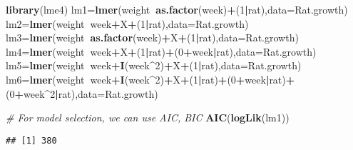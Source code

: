 \documentclass[12pt,]{book}
\newenvironment{Shaded}{\begin{snugshade}}{\end{snugshade}}
\newcommand{\KeywordTok}[1]{\textcolor[rgb]{0.13,0.29,0.53}{\textbf{#1}}}
\newcommand{\DataTypeTok}[1]{\textcolor[rgb]{0.13,0.29,0.53}{#1}}
\newcommand{\DecValTok}[1]{\textcolor[rgb]{0.00,0.00,0.81}{#1}}
\newcommand{\CommentTok}[1]{\textcolor[rgb]{0.56,0.35,0.01}{\textit{#1}}}
\newcommand{\OperatorTok}[1]{\textcolor[rgb]{0.81,0.36,0.00}{\textbf{#1}}}
\newcommand{\NormalTok}[1]{#1}
\begin{document}
\begin{Shaded}
\begin{Highlighting}[]
\KeywordTok{library}\NormalTok{(lme4)}
\NormalTok{lm1=}\KeywordTok{lmer}\NormalTok{(weight}\OperatorTok{~}\KeywordTok{as.factor}\NormalTok{(week)}\OperatorTok{+}\NormalTok{(}\DecValTok{1}\OperatorTok{|}\NormalTok{rat),}\DataTypeTok{data=}\NormalTok{Rat.growth)}
\NormalTok{lm2=}\KeywordTok{lmer}\NormalTok{(weight}\OperatorTok{~}\NormalTok{week}\OperatorTok{+}\NormalTok{X}\OperatorTok{+}\NormalTok{(}\DecValTok{1}\OperatorTok{|}\NormalTok{rat),}\DataTypeTok{data=}\NormalTok{Rat.growth)}
\NormalTok{lm3=}\KeywordTok{lmer}\NormalTok{(weight}\OperatorTok{~}\KeywordTok{as.factor}\NormalTok{(week)}\OperatorTok{+}\NormalTok{X}\OperatorTok{+}\NormalTok{(}\DecValTok{1}\OperatorTok{|}\NormalTok{rat),}\DataTypeTok{data=}\NormalTok{Rat.growth)}
\NormalTok{lm4=}\KeywordTok{lmer}\NormalTok{(weight}\OperatorTok{~}\NormalTok{week}\OperatorTok{+}\NormalTok{X}\OperatorTok{+}\NormalTok{(}\DecValTok{1}\OperatorTok{|}\NormalTok{rat)}\OperatorTok{+}\NormalTok{(}\DecValTok{0}\OperatorTok{+}\NormalTok{week}\OperatorTok{|}\NormalTok{rat),}\DataTypeTok{data=}\NormalTok{Rat.growth)}
\NormalTok{lm5=}\KeywordTok{lmer}\NormalTok{(weight}\OperatorTok{~}\NormalTok{week}\OperatorTok{+}\KeywordTok{I}\NormalTok{(week}\OperatorTok{^}\DecValTok{2}\NormalTok{)}\OperatorTok{+}\NormalTok{X}\OperatorTok{+}\NormalTok{(}\DecValTok{1}\OperatorTok{|}\NormalTok{rat),}\DataTypeTok{data=}\NormalTok{Rat.growth)}
\NormalTok{lm6=}\KeywordTok{lmer}\NormalTok{(weight}\OperatorTok{~}\NormalTok{week}\OperatorTok{+}\KeywordTok{I}\NormalTok{(week}\OperatorTok{^}\DecValTok{2}\NormalTok{)}\OperatorTok{+}\NormalTok{X}\OperatorTok{+}\NormalTok{(}\DecValTok{1}\OperatorTok{|}\NormalTok{rat)}\OperatorTok{+}\NormalTok{(}\DecValTok{0}\OperatorTok{+}\NormalTok{week}\OperatorTok{|}\NormalTok{rat)}\OperatorTok{+}\NormalTok{(}\DecValTok{0}\OperatorTok{+}\NormalTok{week}\OperatorTok{^}\DecValTok{2}\OperatorTok{|}\NormalTok{rat),}\DataTypeTok{data=}\NormalTok{Rat.growth)}
\end{Highlighting}
\end{Shaded}

\begin{Shaded}
\begin{Highlighting}[]
\CommentTok{# For model selection, we can use AIC, BIC }
\KeywordTok{AIC}\NormalTok{(}\KeywordTok{logLik}\NormalTok{(lm1))}
\end{Highlighting}
\end{Shaded}

\begin{verbatim}
## [1] 380
\end{verbatim}
\end{document}
